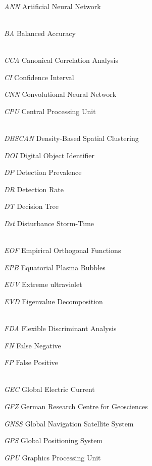\let\LaTeXcline\cline\documentclass[sn-mathphys-num]{sn-jnl}\let\cline\LaTeXcline
\begin{document}
\\[2\baselineskip]

\textit{ANN} Artificial Neural Network


\\[2\baselineskip]

\textit{BA} Balanced Accuracy


\\[2\baselineskip]

\textit{CCA} Canonical Correlation Analysis

\textit{CI} Confidence Interval

\textit{CNN} Convolutional Neural Network

\textit{CPU} Central Processing Unit


\\[2\baselineskip]

\textit{DBSCAN} Density-Based Spatial Clustering

\textit{DOI} Digital Object Identifier

\textit{DP} Detection Prevalence

\textit{DR} Detection Rate

\textit{DT} Decision Tree

\textit{Dst} Disturbance Storm-Time


\\[2\baselineskip]

\textit{EOF} Empirical Orthogonal Functions

\textit{EPB} Equatorial Plasma Bubbles

\textit{EUV} Extreme ultraviolet

\textit{EVD} Eigenvalue Decomposition


\\[2\baselineskip]

\textit{FDA} Flexible Discriminant Analysis

\textit{FN} False Negative

\textit{FP} False Positive


\\[2\baselineskip]

\textit{GEC} Global Electric Current

\textit{GFZ} German Research Centre for Geosciences

\textit{GNSS} Global Navigation Satellite System

\textit{GPS} Global Positioning System

\textit{GPU} Graphics Processing Unit


\\[2\baselineskip]
\end{document}
